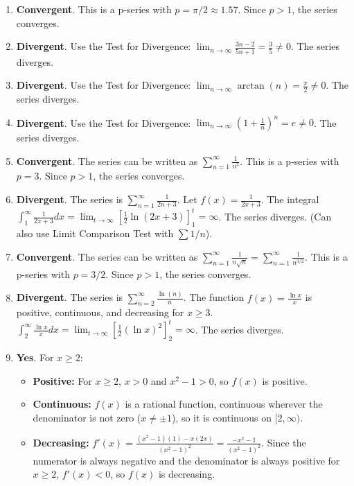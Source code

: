 \documentclass[12pt]{article}
\begin{document}
\begin{enumerate}
    \item \textbf{Convergent}. This is a p-series with $p=\pi/2 \approx 1.57$. Since $p > 1$, the series converges.
    
    \item \textbf{Divergent}. Use the Test for Divergence: $\lim_{n \to \infty} \frac{3n-2}{5n+1} = \frac{3}{5} \neq 0$. The series diverges.
    
    \item \textbf{Divergent}. Use the Test for Divergence: $\lim_{n \to \infty} \arctan(n) = \frac{\pi}{2} \neq 0$. The series diverges.
    
    \item \textbf{Divergent}. Use the Test for Divergence: $\lim_{n \to \infty} \left(1 + \frac{1}{n}\right)^n = e \neq 0$. The series diverges.

    \item \textbf{Convergent}. The series can be written as $\sum_{n=1}^{\infty} \frac{1}{n^3}$. This is a p-series with $p=3$. Since $p > 1$, the series converges.

    \item \textbf{Divergent}. The series is $\sum_{n=1}^{\infty} \frac{1}{2n+3}$. Let $f(x) = \frac{1}{2x+3}$. The integral $\int_1^\infty \frac{1}{2x+3} dx = \lim_{t\to\infty} [\frac{1}{2}\ln(2x+3)]_1^t = \infty$. The series diverges. (Can also use Limit Comparison Test with $\sum 1/n$).

    \item \textbf{Convergent}. The series can be written as $\sum_{n=1}^{\infty} \frac{1}{n\sqrt{n}} = \sum_{n=1}^{\infty} \frac{1}{n^{3/2}}$. This is a p-series with $p=3/2$. Since $p > 1$, the series converges.

    \item \textbf{Divergent}. The series is $\sum_{n=2}^{\infty} \frac{\ln(n)}{n}$. The function $f(x) = \frac{\ln x}{x}$ is positive, continuous, and decreasing for $x \ge 3$. $\int_2^\infty \frac{\ln x}{x} dx = \lim_{t\to\infty} [\frac{1}{2}(\ln x)^2]_2^t = \infty$. The series diverges.
    
    \item \textbf{Yes}. For $x \ge 2$:
        \begin{itemize}
            \item \textbf{Positive:} For $x \ge 2$, $x > 0$ and $x^2-1 > 0$, so $f(x)$ is positive.
            \item \textbf{Continuous:} $f(x)$ is a rational function, continuous wherever the denominator is not zero ($x \neq \pm 1$), so it is continuous on $[2, \infty)$.
            \item \textbf{Decreasing:} $f'(x) = \frac{(x^2-1)(1) - x(2x)}{(x^2-1)^2} = \frac{-x^2-1}{(x^2-1)^2}$. Since the numerator is always negative and the denominator is always positive for $x \ge 2$, $f'(x) < 0$, so $f(x)$ is decreasing.
        \end{itemize}
    

\end{enumerate}
\end{document}
